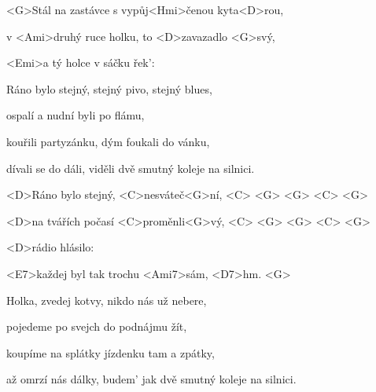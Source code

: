 

\zs
<G>Stál na zastávce s vypůj<Hmi>čenou kyta<D>rou,

v <Ami>druhý ruce holku, to <D>zavazadlo <G>svý,

<Emi>a tý holce v sáčku řek': 
\ks

\zs
Ráno bylo stejný, stejný pivo, stejný blues,

ospalí a nudní byli po flámu,

kouřili partyzánku, dým foukali do vánku,

dívali se do dáli, viděli dvě smutný koleje na silnici.
\ks

\zr
<D>Ráno bylo stejný, <C>nesváteč<G>ní, <C> <G> <G> <C> <G>

<D>na tvářích počasí <C>proměnli<G>vý, <C> <G> <G> <C> <G>

<D>rádio hlásilo: 

<E7>každej byl tak trochu <Ami7>sám, <D7>hm. <G>
\kr

\zs
Holka, zvedej kotvy, nikdo nás už nebere,

pojedeme po svejch do podnájmu žít,

koupíme na splátky jízdenku tam a zpátky,

až omrzí nás dálky, budem' jak dvě smutný koleje na silnici.
\ks

\zr	\kr

\kp
